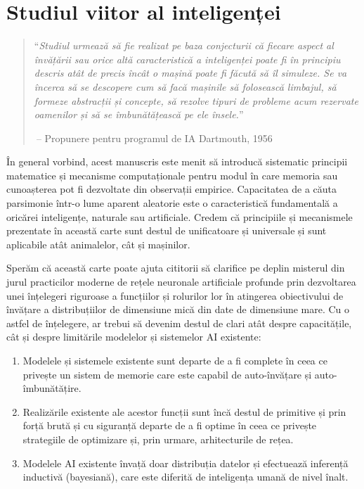 \documentclass[../../book-main_ro.tex]{subfiles}
\begin{document}
\chapter{Studiul viitor al inteligenței}
\label{ch:future}


  

\begin{quote}
``{\em Studiul urmează să fie realizat pe baza conjecturii că fiecare aspect al învățării sau orice altă caracteristică a inteligenței poate fi în principiu descris atât de precis încât o mașină poate fi făcută să îl simuleze. Se va încerca să se descopere cum să facă mașinile să folosească limbajul, să formeze abstracții și concepte, să rezolve tipuri de probleme acum rezervate oamenilor și să se îmbunătățească pe ele însele.}''

$~$\hfill -- Propunere pentru programul de IA Dartmouth, 1956
 \end{quote}
\vspace{5mm}


În general vorbind, acest manuscris este menit să introducă sistematic principii matematice și mecanisme computaționale pentru modul în care memoria sau cunoașterea pot fi dezvoltate din observații empirice. Capacitatea de a căuta parsimonie într-o lume aparent aleatorie este o caracteristică fundamentală a oricărei inteligențe, naturale sau artificiale. Credem că principiile și mecanismele prezentate în această carte sunt destul de unificatoare și universale și sunt aplicabile atât animalelor, cât și mașinilor.

Sperăm că această carte poate ajuta cititorii să clarifice pe deplin misterul din jurul practicilor moderne de rețele neuronale artificiale profunde prin dezvoltarea unei înțelegeri riguroase a funcțiilor și rolurilor lor în atingerea obiectivului de învățare a distribuțiilor de dimensiune mică din date de dimensiune mare. Cu o astfel de înțelegere, ar trebui să devenim destul de clari atât despre capacitățile, cât și despre limitările modelelor și sistemelor AI existente:
\begin{enumerate}
    \item Modelele și sistemele existente sunt departe de a fi complete în ceea ce privește un sistem de memorie care este capabil de auto-învățare și auto-îmbunătățire.
    \item Realizările existente ale acestor funcții sunt încă destul de primitive și prin forță brută și cu siguranță departe de a fi optime în ceea ce privește strategiile de optimizare și, prin urmare, arhitecturile de rețea.
    \item Modelele AI existente învață doar distribuția datelor și efectuează inferență inductivă (bayesiană), care este diferită de inteligența umană de nivel înalt.
\end{enumerate} 
\end{document}
